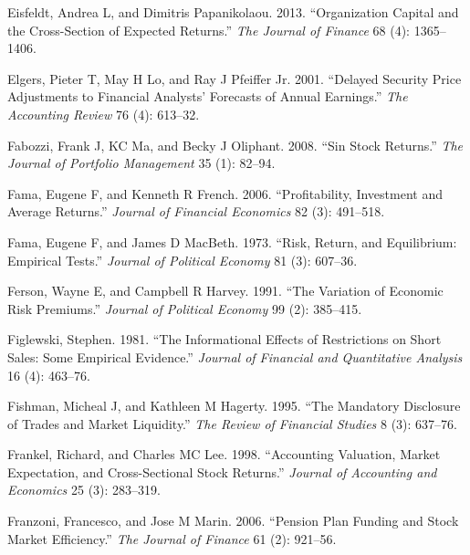 \documentclass[
  letterpaper,
  DIV=11,
  numbers=noendperiod]{scrreprt}
\newlength{\cslhangindent}
\newlength{\cslentryspacingunit} %
\newenvironment{CSLReferences}[2] %
 {%
  \setlength{\parindent}{0pt}
  \ifodd #1
  \let\oldpar\par
  \def\par{\hangindent=\cslhangindent\oldpar}
  \fi
  \setlength{\parskip}{#2\cslentryspacingunit}
 }%
 {}
\begin{document}
\begin{CSLReferences}{1}{0}
\leavevmode{}%
Eisfeldt, Andrea L, and Dimitris Papanikolaou. 2013. {``Organization
Capital and the Cross-Section of Expected Returns.''} \emph{The Journal
of Finance} 68 (4): 1365--1406.

\leavevmode{}%
Elgers, Pieter T, May H Lo, and Ray J Pfeiffer Jr. 2001. {``Delayed
Security Price Adjustments to Financial Analysts' Forecasts of Annual
Earnings.''} \emph{The Accounting Review} 76 (4): 613--32.

\leavevmode{}%
Fabozzi, Frank J, KC Ma, and Becky J Oliphant. 2008. {``Sin Stock
Returns.''} \emph{The Journal of Portfolio Management} 35 (1): 82--94.

\leavevmode{}%
Fama, Eugene F, and Kenneth R French. 2006. {``Profitability, Investment
and Average Returns.''} \emph{Journal of Financial Economics} 82 (3):
491--518.

\leavevmode{}%
Fama, Eugene F, and James D MacBeth. 1973. {``Risk, Return, and
Equilibrium: Empirical Tests.''} \emph{Journal of Political Economy} 81
(3): 607--36.

\leavevmode{}%
Ferson, Wayne E, and Campbell R Harvey. 1991. {``The Variation of
Economic Risk Premiums.''} \emph{Journal of Political Economy} 99 (2):
385--415.

\leavevmode{}%
Figlewski, Stephen. 1981. {``The Informational Effects of Restrictions
on Short Sales: Some Empirical Evidence.''} \emph{Journal of Financial
and Quantitative Analysis} 16 (4): 463--76.

\leavevmode{}%
Fishman, Micheal J, and Kathleen M Hagerty. 1995. {``The Mandatory
Disclosure of Trades and Market Liquidity.''} \emph{The Review of
Financial Studies} 8 (3): 637--76.

\leavevmode{}%
Frankel, Richard, and Charles MC Lee. 1998. {``Accounting Valuation,
Market Expectation, and Cross-Sectional Stock Returns.''} \emph{Journal
of Accounting and Economics} 25 (3): 283--319.

\leavevmode{}%
Franzoni, Francesco, and Jose M Marin. 2006. {``Pension Plan Funding and
Stock Market Efficiency.''} \emph{The Journal of Finance} 61 (2):
921--56.


\end{CSLReferences}
\end{document}
